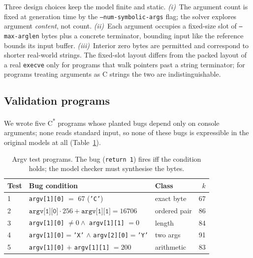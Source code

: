 \documentclass[sigplan,screen,nonacm]{acmart}
\begin{document}
Three design choices keep the model finite and static. \emph{(i)}~The
argument count is fixed at generation time by the
\texttt{--num-symbolic-\allowbreak args} flag; the solver explores
argument \emph{content}, not count. \emph{(ii)}~Each argument occupies a
fixed-size slot of \texttt{--max-arglen} bytes plus a concrete
terminator, bounding input like the reference bounds its input buffer.
\emph{(iii)}~Interior zero bytes are permitted and correspond to shorter
real-world strings. The fixed-slot layout differs from the packed layout
of a real \texttt{execve} only for programs that walk pointers past a
string terminator; for programs treating arguments as C strings the two
are indistinguishable.

\subsection{Validation programs}
\label{sec:argvtests}

We wrote five C\textsuperscript{*} programs whose planted bugs depend
only on console arguments; none reads standard input, so none of these
bugs is expressible in the original models at all
(Table~\ref{tab:argv}).

\begin{table}[t]
\caption{Argv test programs. The bug (\texttt{return 1}) fires iff the
condition holds; the model checker must synthesise the bytes.}
\label{tab:argv}
\centering
\footnotesize
\begin{tabular}{lllr}
\toprule
Test & Bug condition & Class & $k$ \\
\midrule
1 & \texttt{argv[1][0]} $=$ 67 (\texttt{'C'}) & exact byte & 67 \\
2 & $\texttt{argv[1][0]}{\cdot}256 + \texttt{argv[1][1]} = 16706$ & ordered pair & 86 \\
3 & \texttt{argv[1][0]} $\neq 0 \wedge$ \texttt{argv[1][1]} $= 0$ & length & 84 \\
4 & \texttt{argv[1][0]}$=$\texttt{'X'} $\wedge$ \texttt{argv[2][0]}$=$\texttt{'Y'} & two args & 91 \\
5 & \texttt{argv[1][0]} $+$ \texttt{argv[1][1]} $= 200$ & arithmetic & 83 \\
\bottomrule
\end{tabular}
\end{table}
\end{document}

